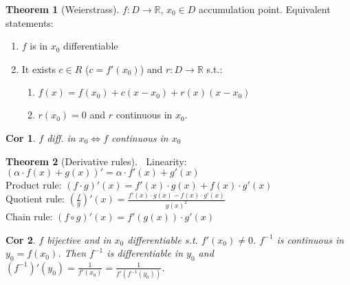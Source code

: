 \documentclass[a4paper, 10pt]{article}
\newtheorem*{corollary}{Cor}
\theoremstyle{definition}
\theoremstyle{named}
\newtheorem*{ntheorem_wrapper}{Theorem}
\newenvironment{ntheorem}%
    {\begin{mdframed}[style=important]\begin{ntheorem_wrapper}}%
    {\end{ntheorem_wrapper}\end{mdframed}}
\newcommand{\R}{\mathbb{R}}
\begin{document}
\begin{ntheorem}[Weierstrass]
    $f: D \to \R$, $x_0 \in D$ accumulation point. Equivalent statements:
    \begin{enumerate}
        \item $f$ is in $x_0$ differentiable
        \item It exists $c \in R$ ($c = f'(x_0)$) and $r: D \to \R$ s.t.:
            \begin{enumerate}
                \item $f(x) = f(x_0) + c(x - x_0) + r(x)(x - x_0)$
                \item $r(x_0) = 0$ and $r$ continuous in $x_0$.
            \end{enumerate}
    \end{enumerate}
\end{ntheorem}

\begin{corollary}
    $f$ diff. in $x_0 \iff f$ continuous in $x_0$
\end{corollary}

\begin{ntheorem}[Derivative rules]$\ $ \newline
    Linearity: $(\alpha \cdot f(x) + g(x))' = \alpha \cdot f'(x) + g'(x)$ \\
    Product rule: $(f \cdot g)'(x) = f'(x)\cdot g(x) + f(x)\cdot g'(x)$ \\
    Quotient rule: $\left(\frac{f}{g}\right)'(x) = \frac{f'(x)\cdot g(x) - f(x)\cdot g'(x)}{g(x)^2}$ \\
    Chain rule: $(f \circ g)'(x) = f'(g(x))\cdot g'(x)$
\end{ntheorem}

\begin{corollary}
    $f$ bijective and in $x_0$ differentiable s.t. $f'(x_0) \neq 0$. $f^{-1}$ is continuous in $y_0 = f(x_0)$. Then $f^{-1}$ is differentiable in $y_0$ and $(f^{-1})'(y_0) = \frac{1}{f'(x_0)} = \frac{1}{f'(f^{-1}(y_0))}$. 
\end{corollary}
\end{document}
